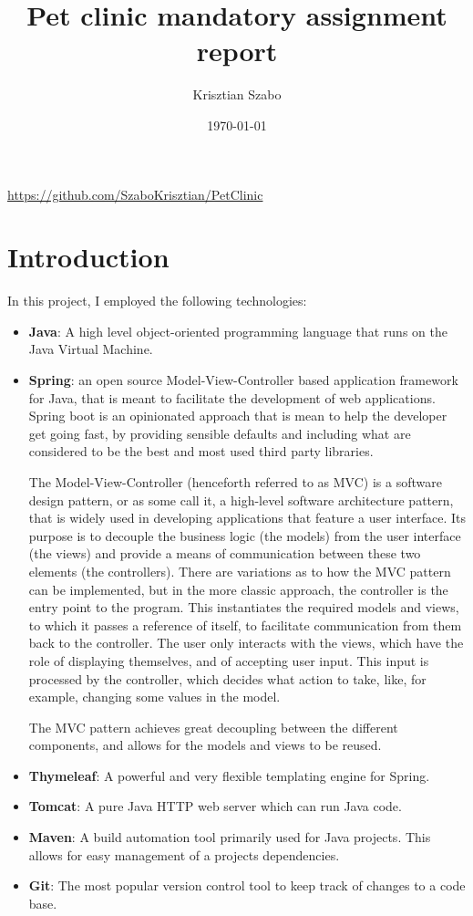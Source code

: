 \documentclass[12pt, a4paper]{article}
\title{Pet clinic mandatory assignment report}
\author{Krisztian Szabo}
\date{\today{}}
\begin{document}
\maketitle
\begin{center}
\url{https://github.com/SzaboKrisztian/PetClinic}
\end{center}
\newpage

\tableofcontents
{}
\newpage

\section{Introduction}
In this project, I employed the following technologies:
\begin{itemize}
\item \textbf{Java}: A high level object-oriented programming language that runs on the Java Virtual Machine.
\item \textbf{Spring}: an open source Model-View-Controller based application framework for Java, that is meant to facilitate the development of web applications. Spring boot is an opinionated approach that is mean to help the developer get going fast, by providing sensible defaults and including what are considered to be the best and most used third party libraries.

The Model-View-Controller (henceforth referred to as MVC) is a software design pattern, or as some call it, a high-level software architecture pattern, that is widely used in developing applications that feature a user interface. Its purpose is to decouple the business logic (the models) from the user interface (the views) and provide a means of communication between these two elements (the controllers). There are variations as to how the MVC pattern can be implemented, but in the more classic approach, the controller is the entry point to the program. This instantiates the required models and views, to which it passes a reference of itself, to facilitate communication from them back to the controller. The user only interacts with the views, which have the role of displaying themselves, and of accepting user input. This input is processed by the controller, which decides what action to take, like, for example, changing some values in the model.

The MVC pattern achieves great decoupling between the different components, and allows for the models and views to be reused.
\item \textbf{Thymeleaf}: A powerful and very flexible templating engine for Spring.
\item \textbf{Tomcat}: A pure Java HTTP web server which can run Java code.
\item \textbf{Maven}: A build automation tool primarily used for Java projects. This allows for easy management of a projects dependencies.
\item \textbf{Git}: The most popular version control tool to keep track of changes to a code base.
\end{itemize}
\end{document}
